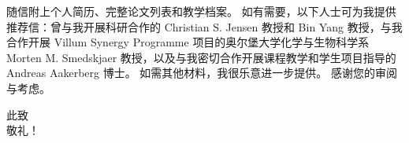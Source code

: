 \documentclass[a4paper]{article}
\begin{document}
\vspace{\entryskip}
随信附上个人简历、完整论文列表和教学档案。
如有需要，以下人士可为我提供推荐信：曾与我开展科研合作的 Christian S. Jensen 教授和 Bin Yang 教授，与我合作开展 Villum Synergy Programme 项目的奥尔堡大学化学与生物科学系 Morten M. Smedskjaer 教授，以及与我密切合作开展课程教学和学生项目指导的 Andreas Aakerberg 博士。
如需其他材料，我很乐意进一步提供。
感谢您的审阅与考虑。

\vspace{\entryskip}
此致\\
敬礼！

\vspace{\entryskip}
\mynamecn
\end{document}
